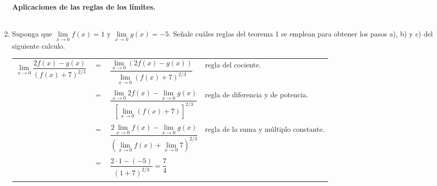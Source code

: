 \begin{enumerate}

\textbf{Aplicaciones de las reglas de los límites.}\\\\

\item Suponga que $\lim\limits_{x\to 0}f(x)=1$ y $\lim\limits_{x\to 0} g(x)=-5$. Señale cuáles reglas del teorema 1 se emplean para obtener los pasos a), b) y c) del siguiente calculo.
\begin{center}
    \begin{tabular}{rcll}
	$\lim\limits_{x\to 0}\dfrac{2f(x)-g(x)}{(f(x)+7)^{2/3}}$&$=$&$\dfrac{\lim\limits_{x\to 0}(2f(x)-g(x))}{\lim\limits_{x\to 0}(f(x)+7)^{2/3}}$&regla del cociente.\\\\
	&$=$&$\dfrac{\lim\limits_{x\to 0}2f(x)-\lim\limits_{x\to 0}g(x)}{\left[\lim\limits_{x\to 0}(f(x)+7)\right]^{2/3}}$&regla de diferencia y de potencia.\\\\
	&$=$&$\dfrac{2\lim\limits_{x\to 0}f(x) - \lim\limits_{x\to 0}g(x)}{\left(\lim\limits_{x\to 0}f(x) + \lim\limits_{x\to 0}7\right)^{2/3}}$&regla de la suma y múltiplo constante.\\\\
	&$=$&$\dfrac{2\cdot 1 - (-5)}{(1+7)^{2/3}}$$= \dfrac{7}{4}$&\\\\
    \end{tabular}
\end{center}


\end{enumerate}
